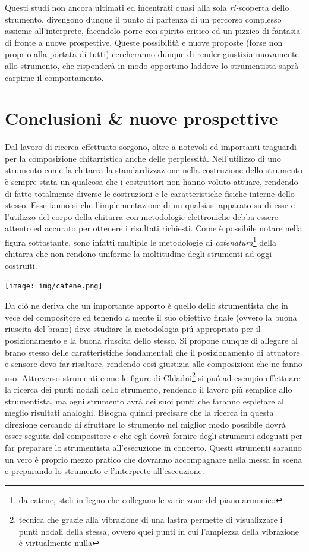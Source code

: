 \documentclass[oneside]{article}
\begin{document}
\begin{multicols*}{2}
Questi studi non ancora ultimati ed incentrati quasi alla sola \textit{ri-}scoperta dello strumento, divengono dunque il punto di partenza di un percorso complesso assieme all'interprete, facendolo porre con spirito critico ed un pizzico di fantasia di fronte a nuove prospettive. Queste possibilità e nuove proposte (forse non proprio alla portata di tutti) cercheranno dunque di render giustizia nuovamente allo strumento, che risponderà in modo opportuno laddove lo strumentista saprà carpirne il comportamento. %

\section{ Conclusioni \& nuove prospettive}

Dal lavoro di ricerca effettuato sorgono, oltre a notevoli ed importanti traguardi per la composizione chitarristica anche delle perplessità. 
Nell’utilizzo di uno strumento come la chitarra la standardizzazione nella costruzione dello strumento è sempre stata un qualcosa che i costruttori non hanno voluto attuare, rendendo di fatto totalmente diverse le costruzioni e le caratteristiche fisiche interne dello stesso. Esse fanno si che l'implementazione di un qualsiasi apparato su di esse e l'utilizzo del corpo della chitarra con metodologie elettroniche debba essere attento ed accurato per ottenere i risultati richiesti. Come è possibile notare nella figura sottostante, sono infatti multiple le metodologie di \textit{catenatura}\footnote{da catene, steli in legno che collegano le varie zone del piano armonico} della chitarra che non rendono uniforme la moltitudine degli strumenti ad oggi costruiti.


\texttt{[image: img/catene.png]}

Da ciò ne deriva che un importante apporto è quello dello strumentista che in vece del compositore ed tenendo a mente il suo obiettivo finale (ovvero la buona riuscita del brano) deve studiare la metodologia piú appropriata per il posizionamento e la buona riuscita dello stesso. Si propone dunque di allegare al brano stesso delle caratteristiche fondamentali che il posizionamento di attuatore e sensore devo far risaltare, rendendo cosí giustizia alle composizioni che ne fanno uso. Attreverso strumenti come le figure di Chladni\footnote{tecnica che grazie alla vibrazione di una lastra permette di visualizzare i punti nodali della stessa, ovvero quei punti in cui l'ampiezza della vibrazione è virtualmente nulla} si puó ad esempio effettuare la ricerca dei punti nodali dello strumento, rendendo il lavoro più semplice allo strumentista, ma ogni strumento avrà dei suoi punti che faranno espletare al meglio risultati analoghi. Bisogna quindi precisare che la ricerca in questa direzione cercando di sfruttare lo strumento nel miglior modo possibile dovrà esser seguita dal compositore e che egli dovrà fornire degli strumenti adeguati per far preparare lo strumentista all'esecuzione in concerto. Questi strumenti saranno un vero è proprio mezzo pratico che dovranno accompagnare nella messa in scena e preparando lo strumento e l'interprete all'esecuzione.



\end{multicols*}
\end{document}

